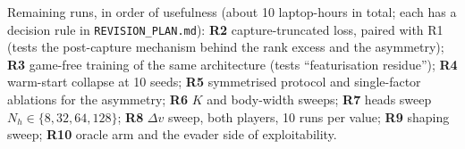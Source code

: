 \documentclass[10pt,a4paper]{article}
\begin{document}
\medskip
Remaining runs, in order of usefulness (about 10 laptop-hours in total; each has a decision rule in \texttt{REVISION\_PLAN.md}):
\textbf{R2} capture-truncated loss, paired with R1 (tests the post-capture mechanism behind the rank excess and the asymmetry);
\textbf{R3} game-free training of the same architecture (tests ``featurisation residue'');
\textbf{R4} warm-start collapse at 10 seeds;
\textbf{R5} symmetrised protocol and single-factor ablations for the asymmetry;
\textbf{R6} $K$ and body-width sweeps;
\textbf{R7} heads sweep $N_h\in\{8,32,64,128\}$;
\textbf{R8} $\Delta v$ sweep, both players, 10 runs per value;
\textbf{R9} shaping sweep;
\textbf{R10} oracle arm and the evader side of exploitability.
\end{document}
